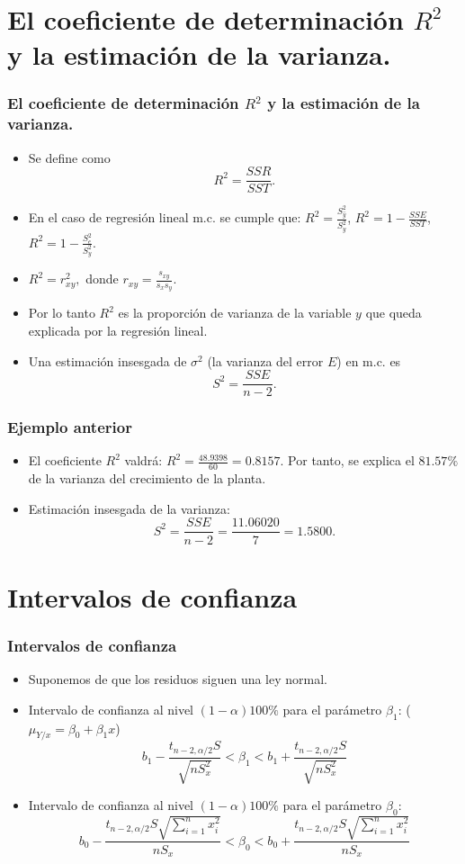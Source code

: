 \section{El coeficiente de determinación $R^2$ y la estimación de la varianza.}
\begin{frame}
\frametitle{El coeficiente de determinación $R^2$ y la estimación de la varianza.}

\begin{itemize}
\item<2->{Se define como $$R^2=\frac{SSR}{SST}.$$}
\item<3->{En el caso de regresión lineal m.c. se cumple que:
$R^2=\frac{S^2_{\hat{y}}}{S^2_y}$, $R^2=1-\frac{SSE}{SST}$, 
$R^2=1-\frac{S^2_e}{S^2_y}$.}
\item<4->{$R^2=r^2_{xy},$ donde $r_{xy}=\frac{s_{xy}}{s_x s_y}$.}
\item<5->{Por lo tanto $R^2$ es la proporción de varianza de la variable $y$
que queda explicada por la regresión lineal.}
\item<6->{Una estimación insesgada de $\sigma^2$ (la varianza del error
$E$) en m.c. es
$$S^2=\frac{SSE}{n-2}.$$}
\end{itemize}
\end{frame}

\begin{frame}
\frametitle{Ejemplo anterior}
\begin{itemize}
\item<2->{El coeficiente $R^2$ valdrá: $R^2 =\frac{48.9398}{60}=0.8157.$ Por tanto, 
se explica el $81.57\%$ de la varianza del crecimiento de la planta.}
\item<3->{Estimación insesgada de la varianza: 
$$S^2 = \frac{SSE}{n-2}=\frac{11.06020}{7}=1.5800.$$}
\end{itemize}
\end{frame}


\section{Intervalos de confianza}
\begin{frame}
\frametitle{Intervalos de confianza}
\begin{itemize}
\item<2->{Suponemos de que los residuos siguen una ley normal.}
\item<3->{Intervalo de confianza al nivel $(1-\alpha)100\%$ para el
parámetro $\beta_1$: ($\mu_{Y/x}=\beta_0+\beta_1 x$)
$$b_1-\frac{t_{n-2,\alpha/2} S}{\sqrt{n S^2_x}}<\beta_1<b_1+\frac{t_{n-2,\alpha/2}S}{\sqrt{
n S^2_x}}$$}
\item<4->{Intervalo de confianza al nivel
$(1-\alpha)100\%$ para el parámetro $\beta_0$: 
$$b_0-\frac{t_{n-2,\alpha/2}S\sqrt{\sum_{i=1}^n x^2_i}}{n
S_{x}}<\beta_0<b_0+\frac{t_{n-2,\alpha/2}S\sqrt{\sum_{i=1}^n
x^2_i}}{n S_{x}}$$}
\end{itemize}
\end{frame}

